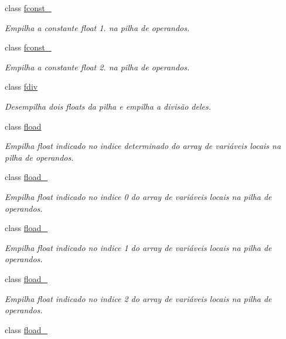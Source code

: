 \begin{DoxyCompactItemize}
class \hyperlink{class_instruction_impl_1_1fconst__1}{fconst\+\_}
\begin{DoxyCompactList}\small\item\em Empilha a constante float 1. na pilha de operandos. \end{DoxyCompactList}\item 
class \hyperlink{class_instruction_impl_1_1fconst__2}{fconst\+\_}
\begin{DoxyCompactList}\small\item\em Empilha a constante float 2. na pilha de operandos. \end{DoxyCompactList}\item 
class \hyperlink{class_instruction_impl_1_1fdiv}{fdiv}
\begin{DoxyCompactList}\small\item\em Desempilha dois floats da pilha e empilha a divisão deles. \end{DoxyCompactList}\item 
class \hyperlink{class_instruction_impl_1_1fload}{fload}
\begin{DoxyCompactList}\small\item\em Empilha float indicado no indice determinado do array de variáveis locais na pilha de operandos. \end{DoxyCompactList}\item 
class \hyperlink{class_instruction_impl_1_1fload__0}{fload\+\_}
\begin{DoxyCompactList}\small\item\em Empilha float indicado no indice 0 do array de variáveis locais na pilha de operandos. \end{DoxyCompactList}\item 
class \hyperlink{class_instruction_impl_1_1fload__1}{fload\+\_}
\begin{DoxyCompactList}\small\item\em Empilha float indicado no indice 1 do array de variáveis locais na pilha de operandos. \end{DoxyCompactList}\item 
class \hyperlink{class_instruction_impl_1_1fload__2}{fload\+\_}
\begin{DoxyCompactList}\small\item\em Empilha float indicado no indice 2 do array de variáveis locais na pilha de operandos. \end{DoxyCompactList}\item 
class \hyperlink{class_instruction_impl_1_1fload__3}{fload\+\_}

\end{DoxyCompactItemize}
